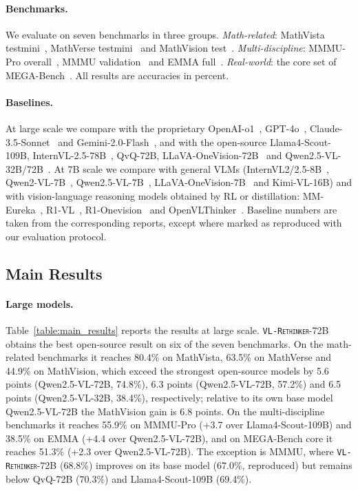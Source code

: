 \documentclass{article}
\newcommand{\model}{\texttt{\textsc{VL-Rethinker}}\xspace}
\begin{document}
\paragraph{Benchmarks.} We evaluate on seven benchmarks in three groups. \emph{Math-related}: MathVista testmini~\cite{mathvista}, MathVerse testmini~\cite{mathverse} and MathVision test~\cite{mathvision}. \emph{Multi-discipline}: MMMU-Pro overall~\cite{mmmupro}, MMMU validation~\cite{yue2024mmmu} and EMMA full~\cite{emma}. \emph{Real-world}: the core set of MEGA-Bench~\cite{chen2024mega}. All results are accuracies in percent.

\paragraph{Baselines.} At large scale we compare with the proprietary OpenAI-o1~\cite{openai-o1}, GPT-4o~\cite{gpt4o}, Claude-3.5-Sonnet~\cite{claude35} and Gemini-2.0-Flash~\cite{gemini}, and with the open-source Llama4-Scout-109B, InternVL-2.5-78B~\cite{internvl_2_5}, QvQ-72B, LLaVA-OneVision-72B~\cite{llavaov} and Qwen2.5-VL-32B/72B~\cite{qwen2_5_vl}. At 7B scale we compare with general VLMs (InternVL2/2.5-8B~\cite{internvl_2_5}, Qwen2-VL-7B~\cite{qwen2vl}, Qwen2.5-VL-7B~\cite{qwen2_5_vl}, LLaVA-OneVision-7B~\cite{llavaov} and Kimi-VL-16B) and with vision-language reasoning models obtained by RL or distillation: MM-Eureka~\cite{mmeureka}, R1-VL~\cite{r1vl}, R1-Onevision~\cite{R1OneVision} and OpenVLThinker~\cite{OpenVLThinker}. Baseline numbers are taken from the corresponding reports, except where marked as reproduced with our evaluation protocol.

\subsection{Main Results}
\label{sec:main}



\paragraph{Large models.} Table~\ref{table:main_results} reports the results at large scale. \model-72B obtains the best open-source result on six of the seven benchmarks. On the math-related benchmarks it reaches 80.4\% on MathVista, 63.5\% on MathVerse and 44.9\% on MathVision, which exceed the strongest open-source models by 5.6 points (Qwen2.5-VL-72B, 74.8\%), 6.3 points (Qwen2.5-VL-72B, 57.2\%) and 6.5 points (Qwen2.5-VL-32B, 38.4\%), respectively; relative to its own base model Qwen2.5-VL-72B the MathVision gain is 6.8 points. On the multi-discipline benchmarks it reaches 55.9\% on MMMU-Pro (+3.7 over Llama4-Scout-109B) and 38.5\% on EMMA (+4.4 over Qwen2.5-VL-72B), and on MEGA-Bench core it reaches 51.3\% (+2.3 over Qwen2.5-VL-72B). The exception is MMMU, where \model-72B (68.8\%) improves on its base model (67.0\%, reproduced) but remains below QvQ-72B (70.3\%) and Llama4-Scout-109B (69.4\%).
\end{document}

